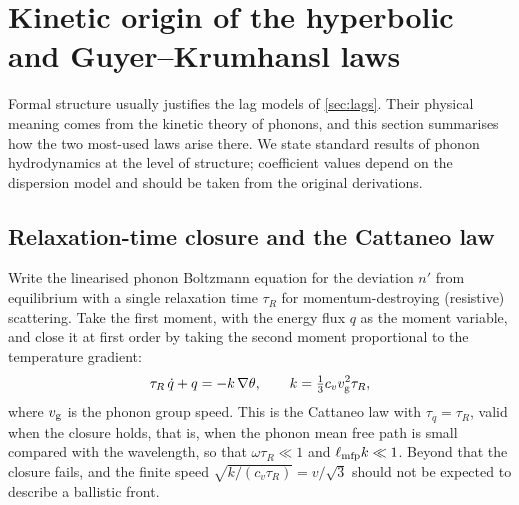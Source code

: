 \section{Kinetic origin of the hyperbolic and Guyer--Krumhansl laws}\label{sec:kinetic}

Formal structure usually justifies the lag models of \cref{sec:lags}. Their physical meaning comes from the kinetic theory of phonons, and this section summarises how the two most-used laws arise there. We state standard results of phonon hydrodynamics at the level of structure; coefficient values depend on the dispersion model and should be taken from the original derivations.

\subsection{Relaxation-time closure and the Cattaneo law}
Write the linearised phonon Boltzmann equation for the deviation $n'$ from equilibrium with a single relaxation time $\tau_R$ for momentum-destroying (resistive) scattering. Take the first moment, with the energy flux $q$ as the moment variable, and close it at first order by taking the second moment proportional to the temperature gradient:
\begin{equation}\label{eq:cattkin}
\tau_R\,\dot q+q=-k\,\nabla\theta,\qquad k=\tfrac13 c_v v_{\rm g}^2\tau_R ,
\end{equation}
where $v_{\rm g}$ is the phonon group speed. This is the Cattaneo law with $\tau_q=\tau_R$, valid when the closure holds, that is, when the phonon mean free path is small compared with the wavelength, so that $\omega\tau_R\ll1$ and $\ell_{\rm mfp}k\ll1$. Beyond that the closure fails, and the finite speed $\sqrt{k/(c_v\tau_R)}=v/\sqrt3$ should not be expected to describe a ballistic front.

